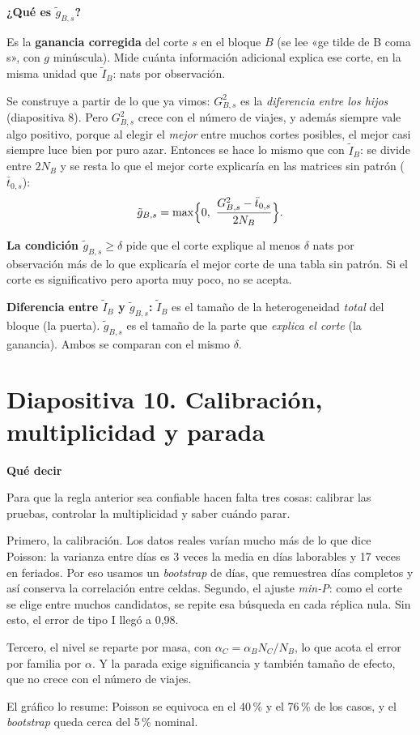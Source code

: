 \documentclass[11pt,a4paper]{article}
\newcommand{\cajainicio}[3]{\par\medskip\noindent
  \begin{lrbox}{\cajabox}\begin{minipage}{\dimexpr\linewidth-2\fboxsep-2\fboxrule\relax}%
  \textbf{\color{#1}#3}\par\smallskip}
\newcommand{\cajafin}[2]{\end{minipage}\end{lrbox}\fcolorbox{#1}{#2}{\usebox{\cajabox}}\par\medskip}
\newenvironment{guion}{\cajainicio{ucspblue}{ucspblue!6}{Qué decir}}{\cajafin{ucspblue}{ucspblue!6}}
\newenvironment{nota}[1]{\cajainicio{acc}{acc!7}{#1}}{\cajafin{acc}{acc!7}}
\begin{document}
\begin{nota}{¿Qué es $\tilde g_{B,s}$?}
Es la \textbf{ganancia corregida} del corte $s$ en el bloque $B$ (se lee «ge tilde de B coma s», con $g$ minúscula). Mide cuánta información adicional explica ese corte, en la misma unidad que $\tilde I_B$: nats por observación.

Se construye a partir de lo que ya vimos: $G^2_{B,s}$ es la \emph{diferencia entre los hijos} (diapositiva 8). Pero $G^2_{B,s}$ crece con el número de viajes, y además siempre vale algo positivo, porque al elegir el \emph{mejor} entre muchos cortes posibles, el mejor casi siempre luce bien por puro azar. Entonces se hace lo mismo que con $\tilde I_B$: se divide entre $2N_B$ y se resta lo que el mejor corte explicaría en las matrices sin patrón ($\bar t_{0,s}$):
\[ \tilde g_{B,s}=\max\Bigl\{0,\ \frac{G^2_{B,s}-\bar t_{0,s}}{2N_B}\Bigr\}. \]

\textbf{La condición $\tilde g_{B,s}\ge\delta$} pide que el corte explique al menos $\delta$ nats por observación más de lo que explicaría el mejor corte de una tabla sin patrón. Si el corte es significativo pero aporta muy poco, no se acepta.

\textbf{Diferencia entre $\tilde I_B$ y $\tilde g_{B,s}$:} $\tilde I_B$ es el tamaño de la heterogeneidad \emph{total} del bloque (la puerta). $\tilde g_{B,s}$ es el tamaño de la parte que \emph{explica el corte} (la ganancia). Ambos se comparan con el mismo $\delta$.
\end{nota}

\newpage
\section*{Diapositiva 10. Calibración, multiplicidad y parada}

\begin{guion}
Para que la regla anterior sea confiable hacen falta tres cosas: calibrar las pruebas, controlar la multiplicidad y saber cuándo parar.

Primero, la calibración. Los datos reales varían mucho más de lo que dice Poisson: la varianza entre días es 3 veces la media en días laborables y 17 veces en feriados. Por eso usamos un \emph{bootstrap} de días, que remuestrea días completos y así conserva la correlación entre celdas. Segundo, el ajuste \emph{min-P}: como el corte se elige entre muchos candidatos, se repite esa búsqueda en cada réplica nula. Sin esto, el error de tipo I llegó a 0,98.

Tercero, el nivel se reparte por masa, con $\alpha_C=\alpha_B N_C/N_B$, lo que acota el error por familia por $\alpha$. Y la parada exige significancia y también tamaño de efecto, que no crece con el número de viajes.

El gráfico lo resume: Poisson se equivoca en el 40\,\% y el 76\,\% de los casos, y el \emph{bootstrap} queda cerca del 5\,\% nominal.
\end{guion}
\end{document}
